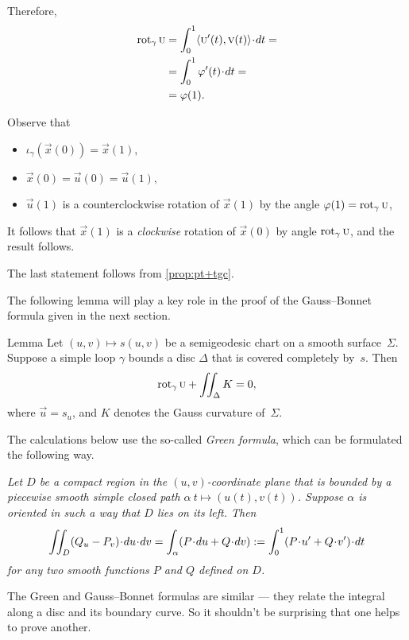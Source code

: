 Therefore,
\begin{align*}
\rot_\gamma\vec u&=\int_0^1\langle\vec u'(t),\vec v(t)\rangle\cdot dt=
\\
&=\int_0^1\phi'(t)\cdot dt=
\\
&=\phi(1).
\end{align*}

Observe that 
\begin{itemize}
\item $\iota_\gamma(\vec x(0))=\vec x(1)$,

\item  $\vec x (0) = \vec u (0) = \vec u (1),$ 

\item $\vec u(1)$ is a counterclockwise rotation of $\vec x(1)$ by the angle $\phi(1)\z=\rot_\gamma\vec u$,

\end{itemize}
It follows that $\vec x(1)$ is a \textit{clockwise} rotation of $\vec x(0)$ by angle $\mathop{\rm rot}\nolimits_\gamma\text{\sc{u}}$, and the result follows.

The last statement follows from \ref{prop:pt+tgc}.
\qeds

The following lemma will play a key role in the proof of the Gauss--Bonnet formula given in the next section.

\begin{thm}{Lemma}\label{lem:rotation-semigeoesic}
Let $(u,v)\mapsto s(u,v)$ be a semigeodesic chart on a smooth surface~$\Sigma$.
Suppose a simple loop $\gamma$ bounds a disc $\Delta$ that is covered completely by~$s$.
Then 
\[\mathop{\rm rot}\nolimits_\gamma\text{\sc{u}}+\iint_\Delta K=0,\]
where $\vec u=s_u$, and $K$ denotes the Gauss curvature of~$\Sigma$.
\end{thm}

The calculations below use the so-called \emph{Green formula}, which can be formulated the following way.

\textit{Let $D$ be a compact region in the $(u,v)$-coordinate plane that is bounded by a piecewise smooth simple closed path $\alpha\:t\mapsto (u(t),v(t))$.
Suppose $\alpha$ is oriented in such a way that $D$ lies on its left.
Then}
\[\iint_D (Q_u- P_v)\cdot du\cdot dv=\int_\alpha (P\cdot du+Q\cdot dv)\df \int_0^1 (P\cdot u'+Q\cdot v')\cdot dt\]
\textit{for any two smooth functions $P$ and $Q$ defined on $D$.}

The Green and Gauss--Bonnet formulas are similar --- they relate the integral along a disc and its boundary curve.
So it shouldn't be  surprising that one helps to prove another.

